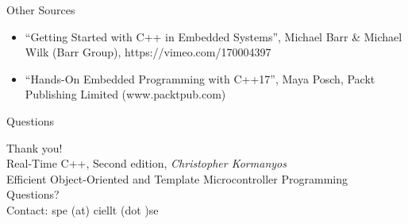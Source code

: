 \documentclass{beamer}
\begin{document}
\begin{frame}{Other Sources}
  \begin{itemize}
  \item ``Getting Started with C++ in Embedded Systems'',
    Michael Barr \& Michael Wilk (Barr Group), https://vimeo.com/170004397
  \item ``Hands-On Embedded Programming with C++17'',
    Maya Posch, Packt Publishing Limited (www.packtpub.com)
  \end{itemize}
\end{frame}

\begin{frame}{Questions}
\begin{center}
  \Large Thank you! \normalsize\\
  \vspace{5mm}
  Real-Time C++, Second edition, \emph{Christopher Kormanyos} \\
  \tiny Efficient Object-Oriented and Template Microcontroller Programming \\
  \vspace{5mm}
  \normalsize Questions? \\
  \vspace{3mm}
  Contact: spe (at) ciellt (dot )se

\end{center}
\end{frame}


\end{document}
